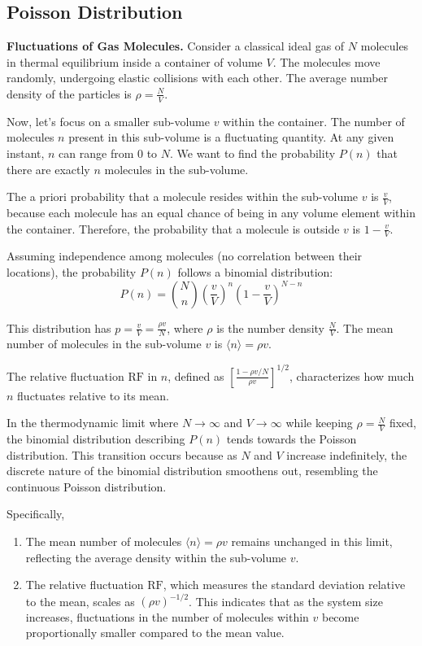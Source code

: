 \subsection{Poisson Distribution}

\begin{example}
    \label{example:fluctuations}
    \textbf{Fluctuations of Gas Molecules.} Consider a classical ideal gas of \( N \) molecules in thermal equilibrium inside a container of volume \( V \). The molecules move randomly, undergoing elastic collisions with each other. The average number density of the particles is \( \rho = \frac{N}{V} \).

    Now, let's focus on a smaller sub-volume \( v \) within the container. The number of molecules \( n \) present in this sub-volume is a fluctuating quantity. At any given instant, \( n \) can range from 0 to \( N \). We want to find the probability \( P(n) \) that there are exactly \( n \) molecules in the sub-volume.

    The a priori probability that a molecule resides within the sub-volume \( v \) is \( \frac{v}{V} \), because each molecule has an equal chance of being in any volume element within the container. Therefore, the probability that a molecule is outside \( v \) is \( 1 - \frac{v}{V} \).

    Assuming independence among molecules (no correlation between their locations), the probability \( P(n) \) follows a binomial distribution:
    \[ P(n) = \binom{N}{n} \left( \frac{v}{V} \right)^n \left( 1 - \frac{v}{V} \right)^{N-n} \]

    This distribution has \( p = \frac{v}{V} = \frac{\rho v}{N} \), where \( \rho \) is the number density \( \frac{N}{V} \). The mean number of molecules in the sub-volume \( v \) is \( \langle n \rangle = \rho v \).

    The relative fluctuation \( \text{RF} \) in \( n \), defined as \( \left[ \frac{1 - \rho v / N}{\rho v} \right]^{1/2} \), characterizes how much \( n \) fluctuates relative to its mean.

    In the thermodynamic limit where \( N \to \infty \) and \( V \to \infty \) while keeping \( \rho = \frac{N}{V} \) fixed, the binomial distribution describing \( P(n) \) tends towards the Poisson distribution. This transition occurs because as \( N \) and \( V \) increase indefinitely, the discrete nature of the binomial distribution smoothens out, resembling the continuous Poisson distribution.

    Specifically,
    \begin{enumerate}
        \item The mean number of molecules \( \langle n \rangle = \rho v \) remains unchanged in this limit, reflecting the average density within the sub-volume \( v \).
        \item The relative fluctuation \( \text{RF} \), which measures the standard deviation relative to the mean, scales as \( (\rho v)^{-1/2} \). This indicates that as the system size increases, fluctuations in the number of molecules within \( v \) become proportionally smaller compared to the mean value.
    \end{enumerate}


\end{example}
